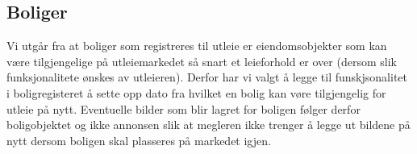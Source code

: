 \subsection{Boliger}
Vi utgår fra at boliger som registreres til utleie er eiendomsobjekter som kan være tilgjengelige på utleiemarkedet så snart et leieforhold er over (dersom slik funksjonalitete ønskes av utleieren). Derfor har vi valgt å legge til funskjsonalitet i boligregisteret å sette opp dato fra hvilket en bolig kan vøre tilgjengelig for utleie på nytt. Eventuelle bilder som blir lagret for boligen følger derfor boligobjektet og ikke annonsen slik at megleren ikke trenger å legge ut bildene på nytt dersom boligen skal plasseres på markedet igjen. 
